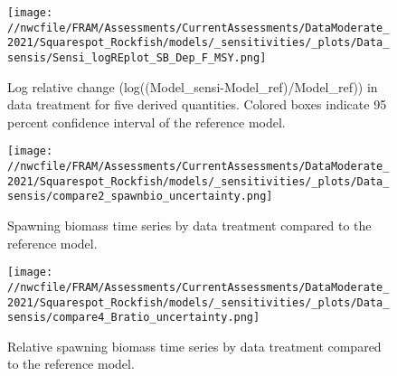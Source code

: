 \documentclass[11pt,
  english,
  a4paper,
]{article}
\begin{document}
\tagmcend\tagstructend


\begin{figure}
\centering
\texttt{[image: //nwcfile/FRAM/Assessments/CurrentAssessments/DataModerate\_2021/Squarespot\_Rockfish/models/\_sensitivities/\_plots/Data\_sensis/Sensi\_logREplot\_SB\_Dep\_F\_MSY.png]}
\caption{Log relative change (log((Model\_sensi-Model\_ref)/Model\_ref)) in data treatment for five derived quantities. Colored boxes indicate 95 percent confidence interval of the reference model.\label{fig:sensi-data-RE}}
\end{figure}

\tagmcend\tagstructend


\begin{figure}
\centering
\texttt{[image: //nwcfile/FRAM/Assessments/CurrentAssessments/DataModerate\_2021/Squarespot\_Rockfish/models/\_sensitivities/\_plots/Data\_sensis/compare2\_spawnbio\_uncertainty.png]}
\caption{Spawning biomass time series by data treatment compared to the reference model.\label{fig:sensi-data-ssb}}
\end{figure}

\tagmcend\tagstructend


\begin{figure}
\centering
\texttt{[image: //nwcfile/FRAM/Assessments/CurrentAssessments/DataModerate\_2021/Squarespot\_Rockfish/models/\_sensitivities/\_plots/Data\_sensis/compare4\_Bratio\_uncertainty.png]}
\caption{Relative spawning biomass time series by data treatment compared to the reference model.\label{fig:sensi-data-depl}}
\end{figure}

\tagmcend\tagstructend

\end{document}
